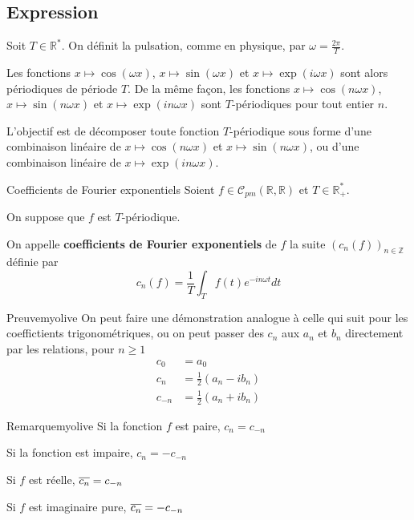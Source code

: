 \subsection{Expression}

    Soit $T \in \mathbb{R}^*$. On définit la pulsation, comme en physique, par $\omega = \frac{2 \pi}{T}$.
    
    Les fonctions $x \mapsto \cos(\omega x)$, $x \mapsto \sin(\omega x)$ et $x \mapsto \exp(i \omega x)$ sont alors périodiques de période $T$. De la même façon, les fonctions $x \mapsto \cos(n\omega x)$, $x \mapsto \sin(n\omega x)$ et $x \mapsto \exp(i n \omega x)$ sont $T$-périodiques pour tout entier $n$.
    
    L’objectif est de décomposer toute fonction $T$-périodique sous forme d’une combinaison linéaire de $x \mapsto \cos(n\omega x)$ et $x \mapsto \sin(n\omega x)$, ou d’une combinaison linéaire de $x \mapsto \exp(i n \omega x)$.

    \begin{prop}{Coefficients de Fourier exponentiels}{}
        Soient $f \in \mathcal{C}_{pm}(\mathbb{R},\mathbb{R})$ et $T \in \mathbb{R}^*_+$.
    
        On suppose que $f$ est $T$-périodique.
    
        On appelle \textbf{coefficients de Fourier exponentiels} de $f$ la suite $(c_n(f))_{n \in \mathbb{Z}}$ définie par 
        \[ c_n(f)= \frac{1}{T}\int_{T} f(t)e^{-i n \omega t}dt \]
    \end{prop}

    \begin{demo}{Preuve}{myolive}
        On peut faire une démonstration analogue à celle qui suit pour les coeffictients trigonométriques, ou on peut passer des $c_n$ aux $a_n$ et $b_n$ directement par les relations, pour $n \geq 1$
        \begin{align*}
            c_0 &= a_0 \\
            c_n &= \frac{1}{2} (a_n - i b_n) \\
            c_{-n} &= \frac{1}{2} (a_n + i b_n) 
        \end{align*}
    \end{demo}

    \begin{omed}{Remarque}{myolive}
        Si la fonction $f$ est paire, $c_n = c_{-n}$
        
        Si la fonction est impaire, $c_n = - c_{-n}$
        
        Si $f$ est réelle, $\overline{c_n} = c_{-n}$
        
        Si $f$ est imaginaire pure, $\overline{c_n} = -c_{-n}$
    \end{omed}

